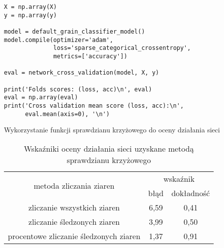 \begin{listing}[htbp]
\begin{verbatim}
X = np.array(X)
y = np.array(y)

model = default_grain_classifier_model()
model.compile(optimizer='adam',
              loss='sparse_categorical_crossentropy',
              metrics=['accuracy'])

eval = network_cross_validation(model, X, y)

print('Folds scores: (loss, acc)\n', eval)
eval = np.array(eval)
print('Cross validation mean score (loss, acc):\n',
      eval.mean(axis=0), '\n')
\end{verbatim}
\caption{Wykorzystanie funkcji sprawdzianu krzyżowego do oceny działania
         sieci}
\label{lst:val}
\end{listing}

\begin{table}[htbp]
	\centering
	\begin{tabular}{c|c|c}
	\toprule
	\multirow{2}{*}{metoda zliczania ziaren} & \multicolumn{2}{c}{wskaźnik} \\ 
                                         & błąd       & dokładność      \\ \midrule
zliczanie wszystkich ziaren              & 6,59       & 0,41            \\
zliczanie śledzonych ziaren              & 3,99       & 0,50             \\
procentowe zliczanie śledzonych ziaren   & 1,37       & 0,91          \\   
	\bottomrule
	\end{tabular}
\caption{Wskaźniki oceny działania sieci uzyskane metodą sprawdzianu
         krzyżowego}
\label{tab:blobval}
\end{table}





